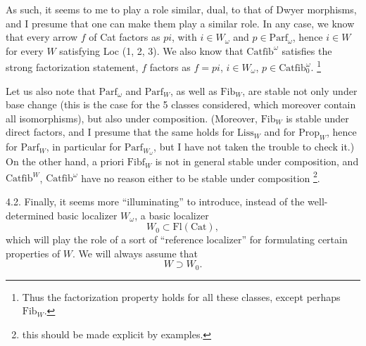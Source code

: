 \documentclass[11pt]{article}
\newcommand{\printedpage}[1]{\marginpar{\footnotesize p.~#1}}
\newcommand{\msp}[1]{\marginpar{\footnotesize [#1]}}
\newcommand{\Fib}{\mathrm{Fib}}
\newcommand{\Fibf}{\mathrm{Fibf}}
\newcommand{\Parf}{\mathrm{Parf}}
\newcommand{\Catfib}{\mathrm{Catfib}}
\newcommand{\Cat}{\mathrm{Cat}}
\begin{document}
As such, it seems to me to play a role similar, dual, to that of Dwyer morphisms, and I presume that one can make them play a similar role. In any \msp{page 29} case, we know that every arrow $f$ of Cat factors as $pi$, with $i \in W_\omega$ and $p \in \Parf_\omega$, hence $i \in W$ for every $W$ satisfying Loc (1, 2, 3). We also know that $\Catfib^\omega$ satisfies the strong factorization statement, $f$ factors as $f = pi$, $i \in W_\omega$, $p \in \Catfib_0^\omega$. \footnote[21]{Thus the factorization property holds for all these classes, except perhaps $\Fib_W$.}

Let us also note that $\Parf_\omega$ and $\Parf_W$, as well as $\Fib_W$, are stable not only under base change (this is the case for the 5 classes considered, which moreover contain all isomorphisms), but also under composition. (Moreover, $\Fib_W$ is stable under direct factors, and I presume that the same holds for $\mathrm{Liss}_W$ and for $\mathrm{Prop}_W$, hence for $\Parf_W$, in particular for $\Parf_{W_\omega}$, but I have not taken the trouble to check it.) On the other hand, a priori $\Fibf_W$ is not in general stable under composition, and $\Catfib^W$, $\Catfib^\omega$ have no reason
\printedpage{20}
either to be stable under composition \footnote[22]{this should be made explicit by examples.}.

4.2. Finally, it seems more ``illuminating'' to introduce, instead of the well-determined basic localizer $W_\omega$, a basic localizer %
\[
W_0 \subset \mathrm{Fl}(\Cat),
\]
which will play the role of a sort of ``reference localizer'' for formulating certain properties of $W$. We will always assume that
\[
W \supset W_0.
\]

\msp{page 30}
\end{document}

